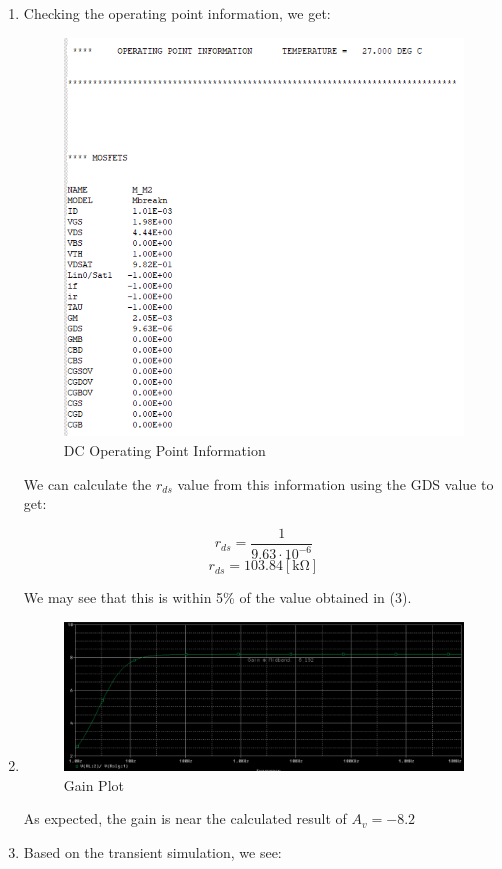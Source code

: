 \begin{enumerate}
\begin{enumerate}
      \item Checking the operating point information, we get:

        \begin{figure}[H]
          \centering
          \includegraphics[width=.6\textwidth]{Figures/HW11-4b}
          \caption{DC Operating Point Information}
          \label{fig:4}
        \end{figure}

        We can calculate the $r_{ds}$ value from this information using the GDS value to get:

        $$r_{ds}=\frac{1}{9.63\cdot10^{-6}}$$
        $$\boxed{r_{ds}=103.84[\si{\kilo\ohm}]}$$

        We may see that this is within 5\% of the value obtained in (3).

      \item 

        \begin{figure}[H]
          \centering
          \includegraphics[width=.8\textwidth]{Figures/HW11-4c}
          \caption{Gain Plot}
          \label{fig:5}
        \end{figure}

        As expected, the gain is near the calculated result of $A_v=-8.2$

      \item Based on the transient simulation, we see:


\end{enumerate}
\end{enumerate}
